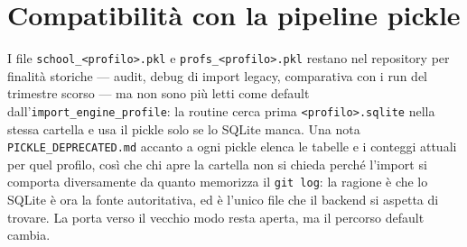 \section{Compatibilit\`a con la pipeline pickle}

I file \texttt{school\_<profilo>.pkl} e
\texttt{profs\_<profilo>.pkl} restano nel repository per finalit\`a
storiche --- audit, debug di import legacy, comparativa con i run
del trimestre scorso --- ma non sono pi\`u letti come default
dall'\texttt{import\_engine\_profile}: la routine cerca prima
\texttt{<profilo>.sqlite} nella stessa cartella e usa il pickle
solo se lo SQLite manca. Una nota \texttt{PICKLE\_DEPRECATED.md}
accanto a ogni pickle elenca le tabelle e i conteggi attuali per
quel profilo, cos\`i che chi apre la cartella non si chieda perch\'e
l'import si comporta diversamente da quanto memorizza il
\texttt{git log}: la ragione \`e che lo SQLite \`e ora la fonte
autoritativa, ed \`e l'unico file che il backend si aspetta di
trovare. La porta verso il vecchio modo resta aperta, ma il
percorso default cambia.
